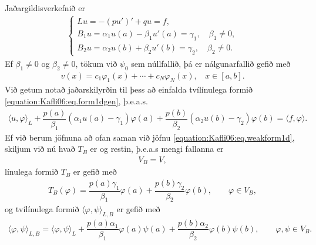 \documentclass[a4paper,10pt,icelandic]{sphinxmanual}
\begin{document}
Jaðargildisverkefnið er
\begin{equation*}
\begin{split}\begin{cases}
Lu=-(pu')'+qu=f, \\
B_1u={\alpha}_1u(a)-\beta_1u'(a)=\gamma_1, \quad \beta_1\neq 0, \\
B_2u=\alpha_2u(b)+{\beta}_2u'(b)=\gamma_2, \quad \beta_2\neq 0.
\end{cases}\end{split}
\end{equation*}
Ef \(\beta_1\neq 0\) og \(\beta_2\neq 0\), tökum við  \(\psi_0\) sem núllfallið, þá er nálgunarfallið gefið með
\begin{equation*}
\begin{split}v(x)=c_1\varphi_1(x)+\cdots+c_N\varphi_N(x),
~~~~x \in [a,b].\end{split}
\end{equation*}
Við getum notað jaðarskilyrðin til þess að einfalda tvílínulega formið \eqref{equation:Kafli06:eq.form1dgen}, þ.e.a.s.
\begin{equation*}
\begin{split}{{\langle u,\varphi\rangle}}_L  +
\dfrac {p(a)}{\beta_1}(\alpha_1u(a)-\gamma_1)\varphi(a)
+\dfrac{p(b)}{\beta_2}(\alpha_2u(b)-\gamma_2)\varphi(b)
={{\langle f,\varphi\rangle}}.\end{split}
\end{equation*}
Ef við berum jöfnuna að ofan saman við jöfnu \eqref{equation:Kafli06:eq.weakform1d},  skiljum við nú hvað \(T_B\) er og restin, þ.e.a.s mengi fallanna er
\begin{equation*}
\begin{split}V_B=V,\end{split}
\end{equation*}
línulega formið \(T_B\) er gefið með
\begin{equation*}
\begin{split}T_B(\varphi)=\dfrac {p(a)\gamma_1}{\beta_1}\varphi(a)
+\dfrac{p(b)\gamma_2}{\beta_2}\varphi(b), \qquad \varphi \in V_B,\end{split}
\end{equation*}
og  tvílínulega formið \({{\langle \varphi,\psi\rangle}}_{L,B}\) er gefið með
\begin{equation*}
\begin{split}{{\langle \varphi,\psi\rangle}}_{L,B}={{\langle \varphi,\psi\rangle}}_L
+\dfrac {p(a)\alpha_1}{\beta_1}\varphi(a)\psi(a)
+\dfrac{p(b)\alpha_2}{\beta_2}\varphi(b)\psi(b),
\qquad \varphi,\psi\in V_B.\end{split}
\end{equation*}
\end{document}
